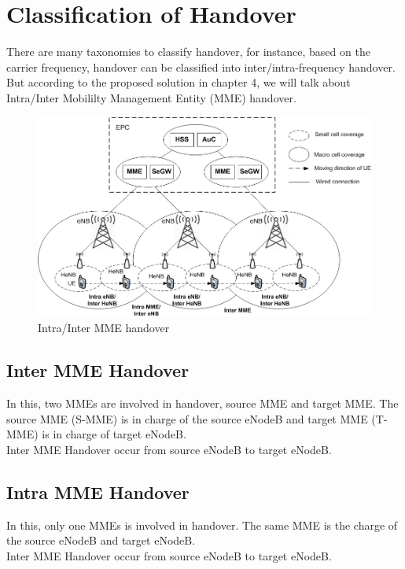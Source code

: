 \section{Classification of Handover}
{
    There are many taxonomies to classify handover, for
instance, based on the carrier frequency, handover can be classified
into inter/intra-frequency handover. But according to the proposed solution in chapter 4,
we will talk about Intra/Inter Mobililty Management Entity (MME) handover.
}
\begin{figure}[ht]
    \centering
    \includegraphics[scale=0.8]{img/handover.jpg}
    \caption{Intra/Inter MME handover}
\end{figure}

\subsection{Inter MME Handover}{
    In this, two MMEs are involved in handover, source MME and target MME.
    The source MME (S-MME) is in charge of the source eNodeB and target MME (T-MME) 
    is in charge of target eNodeB.\\
    Inter MME Handover occur from source eNodeB to target eNodeB.
}

\subsection{Intra MME Handover}{
    In this, only one MMEs is involved in handover.
    The same MME is the charge of the source eNodeB and target eNodeB.\\
    Inter MME Handover occur from source eNodeB to target eNodeB.\\
}


